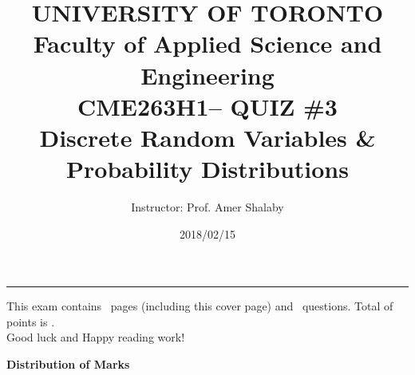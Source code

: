 \documentclass[letterpaper,12pt,addpoints]{exam}
\newcommand{\university}{UNIVERSITY OF TORONTO}
\newcommand{\faculty}{Faculty of Applied Science and Engineering}
\newcommand{\class}{CME263H1}
\newcommand{\examnum}{QUIZ \#3}
\newcommand{\content}{Discrete Random Variables \& Probability Distributions}
\newcommand{\examdate}{2018/02/15}
\begin{document}
\title{\Large \textbf{\university\\ \faculty\\
\bigskip
\class -- \examnum \\ \content}}
\author{Instructor: Prof. Amer Shalaby}
\date{\examdate}
\maketitle
\begin{flushleft}
\medskip
{}
\end{flushleft}
\noindent \rule{\textwidth}{1pt}

\noindent This exam contains \numpages\ pages (including this cover page) and \numquestions\ questions. Total of points is \numpoints.\\
Good luck and Happy reading work!

\begin{center}
\textbf{Distribution of Marks}\\

\gradetable[v][questions]
\end{center}
\end{document}
